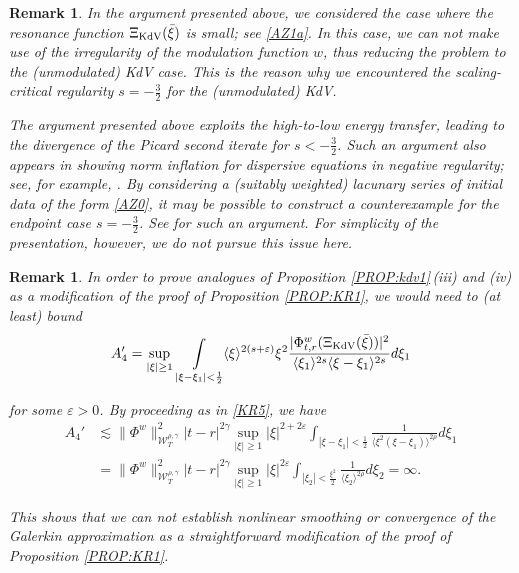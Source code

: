 \documentclass[letterpaper, 11pt,  reqno]{amsart}
\newtheorem{remark}[theorem]{Remark}
\DeclareMathOperator*{\intt}{\int}
\newcommand{\1}{\hspace{0.5mm}\text{I}\hspace{0.5mm}}
\newcommand{\noi}{\noindent}
\newcommand{\eps}{\varepsilon}
\newcommand{\g}{\gamma}
\newcommand{\les}{\lesssim}
\newcommand{\jb}[1]
{\langle #1 \rangle}
\newcommand{\W}{\mathcal{W}}
\newcommand{\KDV}{\text{\rm KdV} }
\numberwithin{equation}{section}
\numberwithin{theorem}{section}
\begin{document}
\begin{remark}
In the argument presented above, 
we considered the case where 
the resonance function 
$\Xi_\KDV (\bar \xi)$
is small; see \eqref{AZ1a}.
In this case, we can not make use
of the irregularity of the modulation function $w$, 
thus reducing the problem to the (unmodulated) KdV case.
This is the reason why we encountered the scaling-critical regularity $s = - \frac 32$
for  the (unmodulated) KdV.





The argument presented above exploits the high-to-low energy transfer, 
leading to the divergence of the Picard second iterate for $s < - \frac 32$.
Such an argument also appears in showing norm inflation
for dispersive equations in negative regularity; see, for example, \cite{OH3, COW}.
By considering
a (suitably weighted) lacunary series of initial data of the form \eqref{AZ0}, 
it may be possible to 
construct a counterexample for  the endpoint case $s = - \frac 32$.
See \cite[Section~4]{COW}
for such an argument.
For simplicity of the presentation, however, we do not pursue this issue here.

\end{remark}
	


\begin{remark}\label{REM:R1}\rm
In order to prove analogues of Proposition \ref{PROP:kdv1}\,(iii) and (iv)
as a modification of the proof of Proposition \ref{PROP:KR1}, 
we would need to 
(at least) bound
\begin{align*}
A_4' = \sup_{|\xi|\ge 1} 
  \intt_{|\xi - \xi_1|< \frac 12} 
  \jb{\xi}^{ 2(s+ \eps) }\xi^2
   \frac{|\Phi^{w}_{t,r} (\Xi_\KDV(\bar \xi)) |^2}{ \jb{\xi_1}^{2s}  \jb{\xi - \xi_1}^{2s}}  d\xi_1
\end{align*}

\noi
for some $\eps > 0$.
By proceeding as in \eqref{KR5}, we have
 \begin{align*}
A_4'
&\les
\|\Phi^w\|^2_{\W_T^{\rho,\g}}
|t-r |^{2\g }    \sup_{|\xi|\ge 1}  |\xi|^{2 + 2\eps}
  \intt_{|\xi - \xi_1|< \frac 12} 
\frac{ 1}{  \jb{\xi^2(\xi - \xi_1)}^{2\rho}} d \xi_1\\
& = 
\|\Phi^w\|^2_{\W_T^{\rho,\g}}
|t-r |^{2\g }  
    \sup_{|\xi|\ge 1}  |\xi|^{2\eps}
  \intt_{|\xi_2|< \frac {\xi^2}2} 
 \frac{1}{\jb{\xi_2}^{2\rho} }d \xi_2
 = \infty.
\end{align*}

\noi
This shows that 
we can not  establish nonlinear smoothing or convergence
of the Galerkin approximation
as a straightforward modification of the proof of Proposition \ref{PROP:KR1}.

\end{remark}
\end{document}
